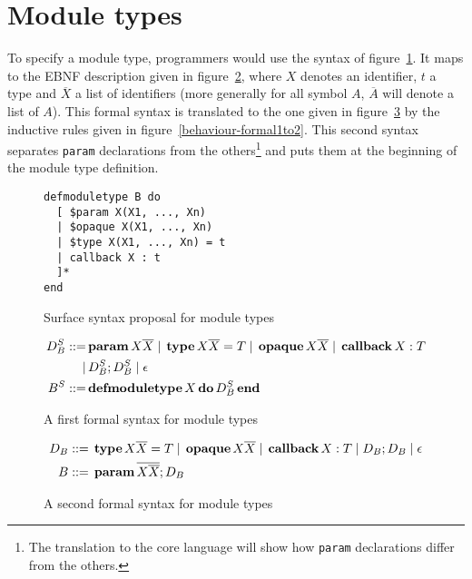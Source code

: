 \documentclass[a4paper,10pt]{article}
\author{Aghilas Y. Boussaa}
\newcommand{\kw}[1]{%
  \,\text{\textbf{#1}}\,
}
\newcommand{\pipe}{%
\; | \;
}
\begin{document}
\section{Module types}
To specify a module type, programmers would use the syntax of
figure~\ref{behaviour-surface}. It maps to the EBNF description given in
figure~\ref{behaviour-formal1}, where $X$ denotes an identifier, $t$ a type and
$\overline{X}$ a list of identifiers (more generally for all symbol $A$,
$\overline{A}$ will denote a list of $A$). This formal syntax is translated to
the one given in figure~\ref{behaviour-formal2} by the inductive rules given in
figure~\ref{behaviour-formal1to2}. This second syntax separates \texttt{param}
declarations from the others\footnote{The translation to the core language will
show how \texttt{param} declarations differ from the others.} and puts them at
the beginning of the module type definition.
\begin{figure}[h]
\begin{verbatim}
defmoduletype B do
  [ $param X(X1, ..., Xn)
  | $opaque X(X1, ..., Xn)
  | $type X(X1, ..., Xn) = t
  | callback X : t
  ]*
end
\end{verbatim}
\caption{Surface syntax proposal for module types}\label{behaviour-surface}
\end{figure}
\begin{figure}[h]
  \begin{align*}D_B^S ::=& \kw{param} X \overline{X} \pipe \kw{type} X
    \overline{X} = T \pipe \kw{opaque} X \overline{X} \pipe \kw{callback} X:T \\
    |&\, D_B^S ; D_B^S \pipe \epsilon \\
    B^S ::=& \kw{defmoduletype} X \kw{do} D_B^S \kw{end}
  \end{align*}
  \caption{A first formal syntax for module types}\label{behaviour-formal1}
\end{figure}
\begin{figure}[h]
  \begin{align*}D_B &::= \kw{type} X \overline{X} = T \pipe \kw{opaque} X
  \overline{X} \pipe \kw{callback} X:T \pipe D_B ; D_B \pipe \epsilon \\
  B &::= \kw{param} \overline{X \overline{X}}; D_B
  \end{align*}
  \caption{A second formal syntax for module types}\label{behaviour-formal2}
\end{figure}
\end{document}
